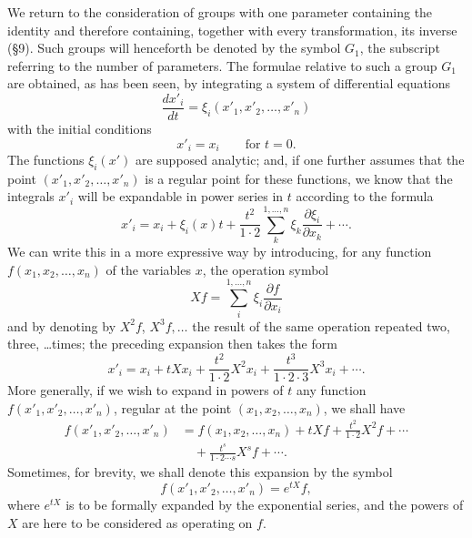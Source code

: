 \documentclass[11pt]{book}
\begin{document}
We return to the consideration of groups with one parameter containing the identity and therefore containing, together with every transformation, its inverse (\S{}9). Such groups will henceforth be denoted by the symbol $G_1$, the subscript referring to the number of parameters. The formulae relative to such a group $G_1$ are obtained, as has been seen, by integrating a system of differential equations
\[
 \frac{dx'_i}{dt}=\xi_i(x'_1,x'_2,\ldots,x'_n)
\]
with the initial conditions
\[
 x'_i=x_i\qquad\text{for }t=0.
\]
The functions $\xi_i(x')$ are supposed analytic; and, if one further assumes that the point $(x'_1,x'_2,\ldots,x'_n)$ is a regular point for these functions, we know that the integrals $x'_i$ will be expandable in power series in $t$ according to the formula
\[
 x'_i=x_i+\xi_i(x)t+\frac{t^2}{1\cdot2}\sum\limits_k^{1,\ldots,n} \xi_k\frac{\partial\xi_i}{\partial x_k}+\cdots .
\]
We can write this in a more expressive way by introducing, for any function $f(x_1,x_2,\ldots,x_n)$ of the variables $x$, the operation symbol
\[
 Xf=\sum\limits_i^{1,\ldots,n}\xi_i\frac{\partial f}{\partial x_i}
\]
and by denoting by $X^2f$, $X^3f,\ldots$ the result of the same operation repeated two, three, \ldots times; the preceding expansion then takes the form
\begin{equation*}\tag{17}
 x'_i=x_i+tXx_i+\frac{t^2}{1\cdot2}X^2x_i+\frac{t^3}{1\cdot2\cdot3}X^3x_i+\cdots .
\end{equation*}
More generally, if we wish to expand in powers of $t$ any function $f(x'_1,x'_2,\ldots,x'_n)$, regular at the point $(x_1,x_2,\ldots,x_n)$, we shall have
\begin{equation*}\tag{18}
\begin{aligned}
 f(x'_1,x'_2,\ldots,x'_n)&=f(x_1,x_2,\ldots,x_n)+tXf+\frac{t^2}{1\cdot2}X^2f+\cdots\\
 &\quad+\frac{t^s}{1\cdot2\cdots s}X^sf+\cdots .
\end{aligned}
\end{equation*}
Sometimes, for brevity, we shall denote this expansion by the symbol
\[
 f(x'_1,x'_2,\ldots,x'_n)=e^{tX}f,
\]
where $e^{tX}$ is to be formally expanded by the exponential series, and the powers of $X$ are here to be considered as operating on $f$.
\end{document}
